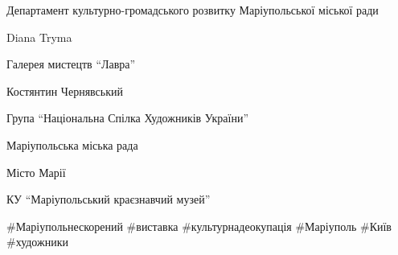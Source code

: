 Департамент культурно-громадського розвитку Маріупольської міської ради\par
Diana Tryma\par
Галерея мистецтв \enquote{Лавра}\par
Костянтин Чернявський\par
Група \enquote{Національна Спілка Художників України}\par
Маріупольська міська рада\par
Місто Марії\par
КУ \enquote{Маріупольський краєзнавчий музей}\par
\#Маріупольнескорений \#виставка \#культурнадеокупація \#Маріуполь \#Київ \#художники\par
